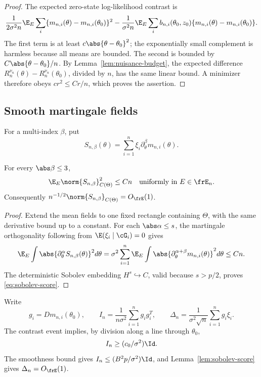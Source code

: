 \begin{proof}
The expected zero-state log-likelihood contrast is
\[
 \frac1{2\sigma^2n}\E_E\sum_i
 \{m_{n,i}(\theta)-m_{n,i}(\theta_0)\}^2
 -\frac1{\sigma^2n}\E_E\sum_i
 b_{n,i}(\theta_0,z_0)
 \{m_{n,i}(\theta)-m_{n,i}(\theta_0)\}.
\]
The first term is at least \(c\abs{\theta-\theta_0}^2\); the exponentially
small complement is harmless because all means are bounded.  The second is
bounded by \(C\abs{\theta-\theta_0}/n\).  By
Lemma~\ref{lem:nuisance-budget}, the expected difference
\(R_n^{\nu_n}(\theta)-R_n^{\nu_n}(\theta_0)\), divided by \(n\), has the same
linear bound.  A minimizer therefore obeys
\(c r^2\le Cr/n\), which proves the assertion.
\end{proof}

\subsection{Smooth martingale fields}

For a multi-index \(\beta\), put
\[
 S_{n,\beta}(\theta)=\sum_{i=1}^n
 \xi_i\partial_\theta^\beta m_{n,i}(\theta).
\]

\begin{lemma}
\label{lem:sobolev-score}
For every \(\abs\beta\le3\),
\begin{equation}
 \E_E\norm{S_{n,\beta}}_{C(\Theta)}^2\le Cn
 \quad\hbox{uniformly in }E\in\frE_n.
 \label{eq:sobolev-score}
\end{equation}
Consequently \(n^{-1/2}\norm{S_{n,\beta}}_{C(\Theta)}=O_{\frE}(1)\).
\end{lemma}

\begin{proof}
Extend the mean fields to one fixed rectangle containing \(\Theta\), with the
same derivative bound up to a constant.  For each \(\abs\alpha\le s\), the
martingale orthogonality following from
\(\E(\xi_i\mid\cG_i)=0\) gives
\[
 \E_E\int
 \abs{\partial_\theta^\alpha S_{n,\beta}(\theta)}^2d\theta
 =\sigma^2\sum_{i=1}^n\E_E\int
 \abs{\partial_\theta^{\alpha+\beta}m_{n,i}(\theta)}^2d\theta
 \le Cn.
\]
The deterministic Sobolev embedding \(H^s\hookrightarrow C\), valid because
\(s>p/2\), proves \eqref{eq:sobolev-score}.
\end{proof}

Write
\[
 g_i=Dm_{n,i}(\theta_0),\qquad
 I_n=\frac1{n\sigma^2}\sum_{i=1}^ng_ig_i^T,\qquad
 \Delta_n=\frac1{\sigma^2\sqrt n}\sum_{i=1}^ng_i\xi_i.
\]
The contrast event implies, by division along a line through \(\theta_0\),
\[
 I_n\ge(c_0/\sigma^2)\Id.
\]
The smoothness bound gives \(I_n\le(B^2p/\sigma^2)\Id\), and
Lemma~\ref{lem:sobolev-score} gives \(\Delta_n=O_{\frE}(1)\).

